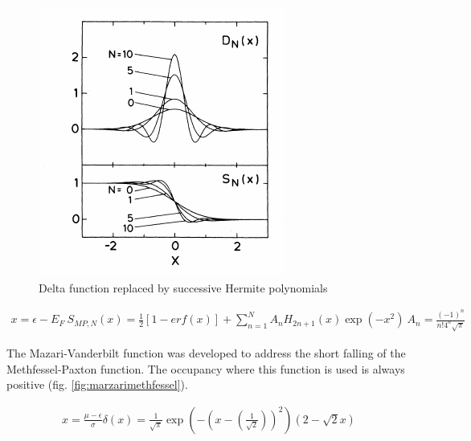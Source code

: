 \begin{figure}
\centering
\begin{minipage}{.65\textwidth}
\centering
    \includegraphics[width=.8\linewidth]{chapters/background_potential_fitting/images/methfesselpaxton.png}
    \caption{Delta function replaced by successive Hermite polynomials\cite{methfesslpaxton}}
    \label{fig:deltahermite}
\end{minipage}
\end{figure}

\begin{equation}
\begin{split}
x = \epsilon - E_F \
S_{MP,N}(x) = \frac{1}{2} \left[1 - erf\left(x\right)\right] + \sum_{n=1}^{N} A_n H_{2n+1}(x)\exp(-x^2)\
A_n = \frac{(-1)^n}{n! 4^n \sqrt{\pi}}
\end{split}
\label{eq:methfesselpaxton}
\end{equation}

The Mazari-Vanderbilt function was developed to address the short falling of the Methfessel-Paxton function.  The occupancy where this function is used is always positive (fig. \ref{fig:marzarimethfessel}).

\begin{equation}
\begin{split}
x = \frac{\mu-\epsilon}{\sigma}
\delta(x) = \frac{1}{\sqrt{\pi}} \exp(-(x-(\frac{1}{\sqrt{2}}))^2) (2-\sqrt{2} x)
\end{split}
\label{eq:methfesselpaxton}
\end{equation}

